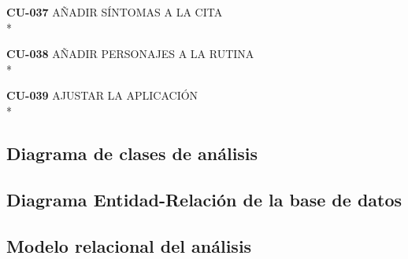 \documentclass[../pfc.tex]{subfiles}
\begin{document}
	\textbf{CU-037}	AÑADIR SÍNTOMAS A LA CITA\\*

	\textbf{CU-038}	AÑADIR PERSONAJES A LA RUTINA\\*
	
	\textbf{CU-039}	AJUSTAR LA APLICACIÓN\\*



		
	\subsection{Diagrama de clases de análisis}
		
	\subsection{Diagrama Entidad-Relación de la base de datos}
		
	\subsection{Modelo relacional del análisis}
	
\end{document}
